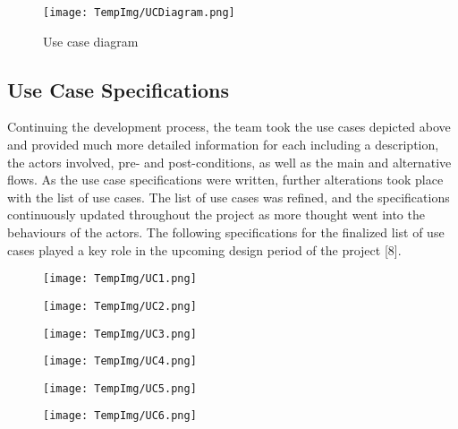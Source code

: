 \documentclass[fontsize=11pt]{extarticle}
\numberwithin{figure}{section} %
\numberwithin{table}{section}%
\begin{document}
\begin{figure}[H]
      \centering
      \texttt{[image: TempImg/UCDiagram.png]}
      \caption{Use case diagram}
 \end{figure}

\hypertarget{use-case-specifications}{%
\subsection{Use Case Specifications}\label{use-case-specifications}}

Continuing the development process, the team took the use cases depicted
above and provided much more detailed information for each including a
description, the actors involved, pre- and post-conditions, as well as
the main and alternative flows. As the use case specifications were
written, further alterations took place with the list of use cases. The
list of use cases was refined, and the specifications continuously
updated throughout the project as more thought went into the behaviours
of the actors. The following specifications for the finalized list of
use cases played a key role in the upcoming design period of the project
{[}8{]}.

\begin{figure}[H]
      \centering
      \texttt{[image: TempImg/UC1.png]}
 \end{figure}

\begin{figure}[H]
      \centering
      \texttt{[image: TempImg/UC2.png]}
 \end{figure}

\begin{figure}[H]
      \centering
      \texttt{[image: TempImg/UC3.png]}
 \end{figure}

\begin{figure}[H]
      \centering
      \texttt{[image: TempImg/UC4.png]}
 \end{figure}

\begin{figure}[H]
      \centering
      \texttt{[image: TempImg/UC5.png]}
 \end{figure}

\begin{figure}[H]
      \centering
      \texttt{[image: TempImg/UC6.png]}
 \end{figure}
\end{document}
